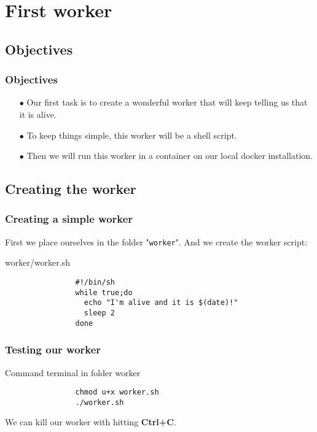 \section{First worker}

\subsection{Objectives}	
	\begin{frame}
		\frametitle{Objectives}
		
		\begin{itemize}
			\item[$\bullet$] Our first task is to create a wonderful worker that will keep telling us that it is alive.
			\item[$\bullet$] To keep things simple, this worker will be a shell script.	
			\item[$\bullet$] Then we will run this worker in a container on our local docker installation.
		\end{itemize}
		
	\end{frame}

\subsection{Creating the worker}
	
	\begin{frame}[fragile]
		\frametitle{Creating a simple worker}

		First we place ourselves in the folder "\verb!worker!". And we create the worker script:
		
		\begin{block}{worker/worker.sh}
			\begin{verbatim}
				#!/bin/sh
				while true;do
				  echo "I'm alive and it is $(date)!"
				  sleep 2
				done
			\end{verbatim}
		\end{block}
		
	\end{frame}

	\begin{frame}[fragile]
		\frametitle{Testing our worker}
		
		\begin{block}{Command terminal in folder worker}
			\begin{verbatim}
				chmod u+x worker.sh
				./worker.sh
			\end{verbatim}
		\end{block}
		We can kill our worker with hitting \textbf{Ctrl+C}.
		
	\end{frame}
	
